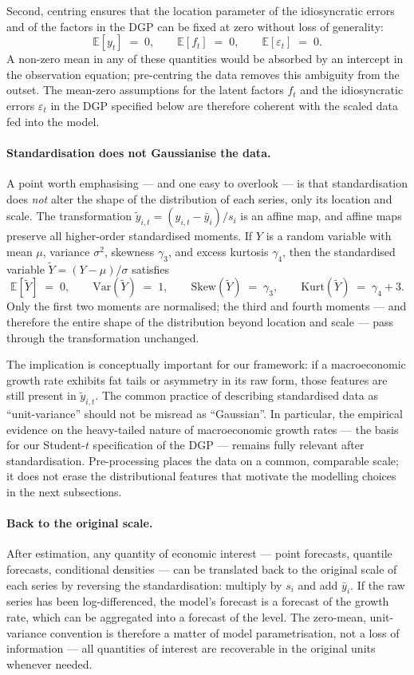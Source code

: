 \documentclass[11pt, a4paper, oneside]{article}
\begin{document}
Second, centring ensures that the location parameter of the
idiosyncratic errors and of the factors in the DGP can be fixed at
zero without loss of generality:
\[
\mathbb{E}[y_t] \;=\; 0, \qquad \mathbb{E}[f_t] \;=\; 0, \qquad \mathbb{E}[\varepsilon_t] \;=\; 0.
\]
A non-zero mean in any of these quantities would be absorbed by an
intercept in the observation equation; pre-centring the data removes
this ambiguity from the outset. The mean-zero assumptions for the
latent factors $f_t$ and the idiosyncratic errors $\varepsilon_t$ in
the DGP specified below are therefore coherent with the scaled data
fed into the model.

\paragraph{Standardisation does not Gaussianise the data.}
A point worth emphasising — and one easy to overlook — is that
standardisation does \emph{not} alter the shape of the distribution
of each series, only its location and scale. The transformation
$\tilde{y}_{i,t} = (y_{i,t} - \bar{y}_i)/s_i$ is an affine map, and
affine maps preserve all higher-order standardised moments. If
$Y$ is a random variable with mean $\mu$, variance $\sigma^2$,
skewness $\gamma_3$, and excess kurtosis $\gamma_4$, then the
standardised variable $\tilde{Y} = (Y - \mu)/\sigma$ satisfies
\[
\mathbb{E}[\tilde{Y}] \;=\; 0, \qquad \mathrm{Var}(\tilde{Y}) \;=\; 1, \qquad \mathrm{Skew}(\tilde{Y}) \;=\; \gamma_3, \qquad \mathrm{Kurt}(\tilde{Y}) \;=\; \gamma_4 + 3.
\]
Only the first two moments are normalised; the third and fourth
moments — and therefore the entire shape of the distribution beyond
location and scale — pass through the transformation unchanged.

The implication is conceptually important for our framework: if a
macroeconomic growth rate exhibits fat tails or asymmetry in its raw
form, those features are still present in $\tilde{y}_{i,t}$. The
common practice of describing standardised data as ``unit-variance''
should not be misread as ``Gaussian''. In particular, the empirical
evidence on the heavy-tailed nature of macroeconomic growth rates —
the basis for our Student-$t$ specification of the DGP — remains
fully relevant after standardisation. Pre-processing places the data
on a common, comparable scale; it does not erase the distributional
features that motivate the modelling choices in the next subsections.

\paragraph{Back to the original scale.}
After estimation, any quantity of economic interest — point forecasts,
quantile forecasts, conditional densities — can be translated back to
the original scale of each series by reversing the standardisation:
multiply by $s_i$ and add $\bar{y}_i$. If the raw series has been
log-differenced, the model's forecast is a forecast of the growth rate,
which can be aggregated into a forecast of the level. The zero-mean,
unit-variance convention is therefore a matter of model parametrisation,
not a loss of information — all quantities of interest are recoverable
in the original units whenever needed.
\end{document}
